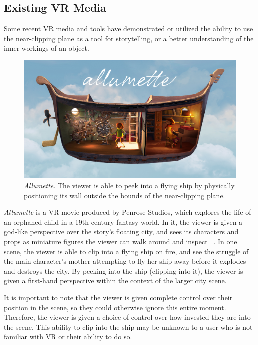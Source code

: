 \documentclass[10pt,twocolumn,letterpaper]{article}
\begin{document}
\subsection{Existing VR Media}

Some recent VR media and tools have demonstrated or utilized the ability to use the near-clipping plane as a tool for storytelling, or a better understanding of the inner-workings of an object.

\begin{figure}[t]
\begin{center}
\includegraphics[width=1.0\linewidth]{images/allumette.jpg}
\end{center}
   \caption{\textit{Allumette}.  The viewer is able to peek into a flying ship by physically positioning its wall outside the bounds of the near-clipping plane. }
\label{fig:long}
\label{fig:onecol}
\end{figure}

\textit{Allumette} is a VR movie produced by Penrose Studios, which explores the life of an orphaned child in a 19th century fantasy world. In it, the viewer is given a god-like perspective over the story's floating city, and sees its characters and props as miniature figures the viewer can walk around and inspect ~\cite{Allumette}. In one scene, the viewer is able to clip into a flying ship on fire, and see the struggle of the main character's mother attempting to fly her ship away before it explodes and destroys the city. By peeking into the ship (clipping into it), the viewer is given a first-hand perspective within the context of the larger city scene.

It is important to note that the viewer is given complete control over their position in the scene, so they could otherwise ignore this entire moment. Therefore, the viewer is given a choice of control over how invested they are into the scene. This ability to clip into the ship may be unknown to a user who is not familiar with VR or their ability to do so.\\
\end{document}
